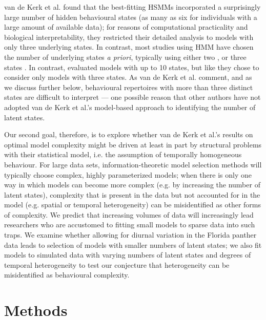 \documentclass{bmcart}
\begin{document}
van de Kerk et al.\cite{kerk2015hidden} found that the best-fitting HSMMs
incorporated a surprisingly large number of hidden
behavioural states (as many as six for individuals with a large amount
of available data); for reasons of computational 
practicality and biological interpretability, they restricted their
detailed analysis to models with only three underlying states.  In
contrast, most studies using HMM have chosen the
number of underlying states \emph{a priori}, typically using either two
\cite{schliehe-diecks_application_2012,mckellar_using_2014,langrock_flexible_2012,fryxell_multiple_2008}, or three states
\cite{dean2012behavioural,morales_extracting_2004,franke_prediction_2006}. 
In contrast, \cite{dean_behavioural_2013} evaluated models with up to 10
states, but like \cite{kerk2015hidden} they chose to consider only 
models with three states. 
As van de Kerk et al. \cite{kerk2015hidden} comment, and as
we discuss further below, behavioural
repertoires with more than three distinct states are difficult to
interpret --- one possible reason that other authors have not adopted
van de Kerk et al.'s model-based approach to
identifying the number of latent states.

Our second goal, therefore, is to explore whether
van de Kerk et al.'s results on optimal
model complexity might be driven at
least in part by structural problems with their statistical
model, i.e. the
assumption of temporally homogeneous behaviour.  For large data sets, 
information-theoretic model selection methods will
typically choose complex, highly parameterized models; when there is
only one way in which models can become more complex (e.g. by
increasing the number of latent states), complexity that is
present in the data but not accounted for in the model (e.g. spatial
or temporal heterogeneity) can be misidentified as other forms of
complexity.  We predict that increasing volumes of data will
increasingly lead researchers who are accustomed to fitting 
small models to sparse data into such traps.  We examine whether
allowing for diurnal variation in the Florida panther data leads to
selection of models with smaller numbers of latent states; we also
fit models to simulated data with varying numbers of latent states
and degrees of temporal heterogeneity to test our conjecture that
heterogeneity can be misidentified as behavioural complexity.

\section*{Methods}
\end{document}
